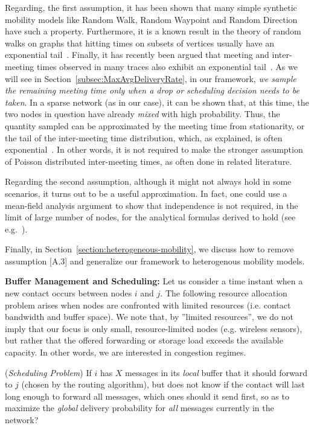 Regarding, the first assumption, it has been shown that many simple synthetic mobility models like Random Walk, Random Waypoint and Random Direction~\cite{akis:mobihoc06,Inria:MessageDelay} have such a property. Furthermore, it is a known result in the theory of random walks on graphs that hitting times on subsets of vertices usually have an exponential tail~\cite{Aldous:book}. Finally, it has recently been argued that meeting and inter-meeting times observed in many traces also exhibit an exponential tail~\cite{LeBoudec:Mobicom07}. As we will see in Section~\ref{subsec:MaxAvgDeliveryRate}, in our framework, \emph{we sample the remaining meeting time only when a drop or scheduling decision needs to be taken}. In a sparse network (as in our case), it can be shown that, at this time, the two nodes in question have already \emph{mixed} with high probability. Thus, the quantity sampled can be approximated by the meeting time from stationarity, or the tail of the inter-meeting time distribution, which, as explained, is often exponential~\cite{Akis:IJAACS2008}. In other words, it is not required to make the stronger assumption of Poisson distributed inter-meeting times, as often done in related literature.

Regarding the second assumption, although it might not always hold in some scenarios, it turns out to be a useful approximation. In fact, one could use a mean-field analysis argument to show that independence is not required, in the limit of large number of nodes, for the analytical formulas derived to hold (see e.g.~\cite{LeBoudec:Sigmetrics09}).

Finally, in Section~\ref{section:heterogeneous-mobility}, we discuss how to remove assumption [A.3] and generalize our framework to heterogenous mobility models.

\textbf{Buffer Management and Scheduling:} Let us consider a time instant when a new contact occurs between nodes $i$ and $j$. The following resource allocation problem arises when nodes are confronted with limited resources (i.e. contact bandwidth and buffer space). We note that, by ''limited resources'', we do not imply that our focus is only small, resource-limited nodes (e.g. wireless sensors), but rather that the offered forwarding or storage load exceeds the available capacity. In other words, we are interested in congestion regimes.

(\emph{Scheduling Problem}) If $i$ has $X$ messages in its \emph{local} buffer that it should forward to $j$ (chosen by the routing algorithm), but does not know if the contact will last long enough to forward all messages, which ones should it send first, so as to maximize the \emph{global} delivery probability for \emph{all} messages currently in the network?

